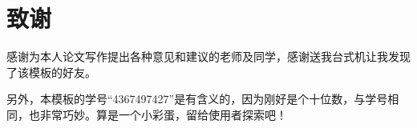 \chapter{致谢}

感谢为本人论文写作提出各种意见和建议的老师及同学，感谢送我台式机让我发现了该模板的好友。

另外，本模板的学号“4367497427”是有含义的，因为刚好是个十位数，与学号相同，也非常巧妙。算是一个小彩蛋，留给使用者探索吧！
